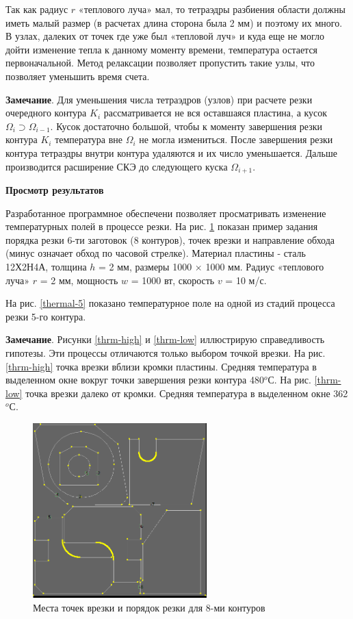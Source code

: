 \documentclass[12pt]{report}
\begin{document}
Так как радиус  $r$
«теплового луча» мал,
то тетраэдры разбиения области должны иметь малый размер
(в расчетах длина сторона была  2 мм)
и поэтому их много.
В узлах, далеких от точек где уже был «тепловой луч»
и куда еще не могло дойти изменение тепла к данному моменту времени,
температура остается первоначальной.
Метод релаксации позволяет пропустить такие узлы,
что позволяет уменьшить время счета.

{\bf Замечание}.
Для уменьшения числа тетраэдров (узлов)
при расчете резки очередного контура
$K_i$
рассматривается не вся оставшаяся пластина, а кусок
$\Omega_i \supset \Omega_{i-1}$.
Кусок  достаточно большой,
чтобы к моменту завершения резки контура
$K_i$
температура вне
$\Omega_i$
не могла измениться.
После завершения резки контура
тетраэдры внутри контура удаляются и их число уменьшается.
Дальше производится расширение СКЭ до следующего куска
$\Omega_{i+1}$.

{\bf Просмотр результатов}

Разработанное программное обеспечени
позволяет просматривать изменение температурных полей
в процессе резки.
На рис. \ref{thermal-plan}
показан пример задания порядка резки
6-ти заготовок (8 контуров),
точек врезки и направление обхода
(минус означает обход по часовой стрелке).
Материал пластины -  сталь 12Х2Н4А,
толщина $h$ = 2 мм, размеры 1000 $\times$ 1000 мм.
Радиус «теплового луча» $r$ = 2 мм,
мощность $w$ = 1000 вт,
скорость $v$ = 10 м/с.

На рис. \ref{thermal-5} показано температурное поле
на одной из стадий процесса резки 5-го контура.

{\bf Замечание}.
Рисунки \ref{thrm-high} и \ref{thrm-low}  иллюстрирую справедливость гипотезы.
Эти процессы отличаются только выбором точкой врезки.
На рис. \ref{thrm-high} точка врезки вблизи кромки пластины.
Средняя температура в выделенном окне
вокруг точки завершения резки контура 480$^o$С.
На рис. \ref{thrm-low} точка врезки далеко от кромки.
Средняя температура в выделенном окне  362$^o$С.

\begin{figure}
  \centering
  \includegraphics[width=0.6\textwidth]{thermal-plan.png}
  \caption{Места точек врезки и порядок резки для 8-ми контуров}
  \label{thermal-plan}
\end{figure}
\end{document}
